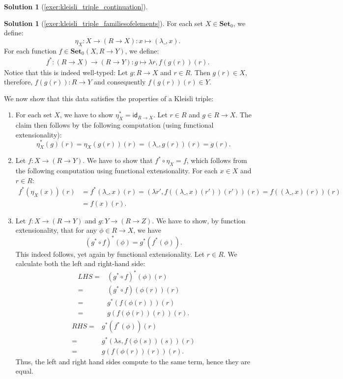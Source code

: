 \documentclass[a4paper,11pt, oneside,titlepage=false]{scrbook}
\theoremstyle{plain}
\theoremstyle{definition}
\newtheorem{solution}[thm]{Solution}
\newcommand{\cfont}[1]{\ensuremath{\mathsf{#1}}}
\newcommand{\Catb}[1]{\mathbf{#1}}
\newcommand{\SET}{\Catb{Set}}
\newcommand{\Ob}[1]{{#1}_0}
\newcommand{\CHom}[3]{{#1}(#2,#3)}
\newcommand{\Id}[1][]{\cfont{id}_{#1}}
\newcommand{\co}[2]{\ensuremath{#2 \circ #1}}
\begin{document}
\begin{solution}[\cref{exer:kleisli_triple_continuation}]
\begin{enumerate}
\end{enumerate}
\end{solution}

\begin{solution}[\cref{exer:kleisli_triple_familiesofelements}]\label{sol:kleisli_triple_familiesofelements}
For each set $X\in\Ob \SET$, we define:
\[
\eta_X : X \to (R \to X) : x\mapsto (\lambda \_, x).
\]
For each function $f\in\CHom{\Ob \SET}{X}{R\to Y}$, we define:
\begin{align*}
f^{*} : (R\to X) \to (R\to Y) : g \mapsto \lambda r, f(g(r))(r).
\end{align*}
Notice that this is indeed well-typed: Let $g : R\to X$ and $r\in R$. Then $g(r)\in X$, therefore, $f(g(r)) : R\to Y$ and consequently $f(g(r))(r)\in Y$.

We now show that this data satisfies the properties of a Kleisli triple:
\begin{enumerate}
\item For each set $X$, we have to show $\eta_X^{*} = \Id[R\to X]$. Let $r\in R$ and $g\in R\to X$. The claim then follows by the following computation (using functional extensionality):
\[
\eta_X^{*}(g)(r) = \eta_X(g(r))(r) = (\lambda \_, g(r))(r) = g(r).
\]
\item Let $f: X\to (R\to Y)$. We have to show that $\co{\eta_X}{f^{*}} = f$, which follows from the following computation using functional extensionality. For each $x\in X$ and $r\in R$:
\begin{align*}
	f^{*}(\eta_X(x))(r) & = f^{*}(\lambda \_,x)(r) = \left(\lambda r', f((\lambda \_, x)(r'))(r')\right)(r) = f((\lambda \_,x)(r))(r) \\
	& = f(x)(r).
\end{align*}

\item Let $f: X\to (R\to Y)$ and $g: Y\to (R\to Z)$. We have to show, by function extensionality, that for any $\phi\in R\to X$, we have
\[
(\co{f}{g^{*}})^{*}(\phi) = g^{*}(f^{*}(\phi)).
\]
This indeed follows, yet again by functional extensionality. Let $r\in R$. We calculate both the left and right-hand side:
\begin{align*}
LHS =& (\co{f}{g^{*}})^{*}(\phi)(r)\\
	=& (\co{f}{g^{*}})(\phi(r))(r)\\
	=& g^{*}\left(f(\phi(r))\right)(r)\\
	=& g\left(f(\phi(r))(r)\right)(r).
\end{align*}
\begin{align*}
RHS =& g^{*}(f^{*}(\phi))(r)\\
	=& g^{*}\left(\lambda s, f(\phi(s))(s)\right)(r)\\
	=& g( f(\phi(r))(r) )(r).
\end{align*}
Thus, the left and right hand sides compute to the same term, hence they are equal.
\end{enumerate}
\end{solution}
\end{document}

